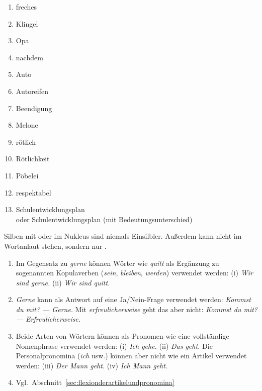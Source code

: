 \label{sol:phonologie05}

\begin{enumerate}
  \item \Akz freches
  \item \Akz Klingel
  \item \Akz Opa
  \item nach\Akz dem
  \item \Akz Auto
  \item \Akz Autoreifen
  \item Be\Akz endigung
  \item Me\Akz lone
  \item \Akz rötlich
  \item \Akz Rötlichkeit
  \item Pöbe\Akz lei
  \item respek\Akz tabel
  \item \Akz Schulentwicklungsplan\\
    oder Schulent\Akz wicklungsplan (mit Bedeutungsunterschied)
\end{enumerate}

\label{sol:phonologie07}

Silben mit \textipa{[@]} oder \textipa{[5]} im Nukleus sind niemals Einsilbler.
Außerdem kann \textipa{[s]} nicht im Wortanlaut stehen, sondern nur \textipa{[z]}.


\label{sol:wortklassen02}

\begin{sloppypar}

\begin{enumerate}
  \item Im Gegensatz zu \textit{gerne} können Wörter wie \textit{quitt} als Ergänzung zu sogenannten Kopulaverben (\textit{sein}, \textit{bleiben}, \textit{werden}) verwendet werden:
    (i) \Ast \textit{Wir sind gerne.} (ii) \textit{Wir sind quitt.}
  \item \textit{Gerne} kann als Antwort auf eine Ja\slash Nein-Frage verwendet werden:
    \textit{Kommst du mit? --- Gerne.}
    Mit \textit{erfreulicherweise} geht das aber nicht:
    \textit{Kommst du mit? --- \Ast Erfreulicherweise.}
  \item Beide Arten von Wörtern können als Pronomen wie eine vollständige Nomenphrase verwendet werden:
    (i) \textit{Ich gehe.}
    (ii) \textit{Das geht.}
    Die Personalpronomina (\textit{ich} usw.) können aber nicht wie ein Artikel verwendet werden:
    (iii) \textit{Der Mann geht.}
    (iv) \Ast \textit{Ich Mann geht.}
  \item Vgl.\ Abschnitt~\ref{sec:flexionderartikelundpronomina}
\end{enumerate}

\end{sloppypar}

